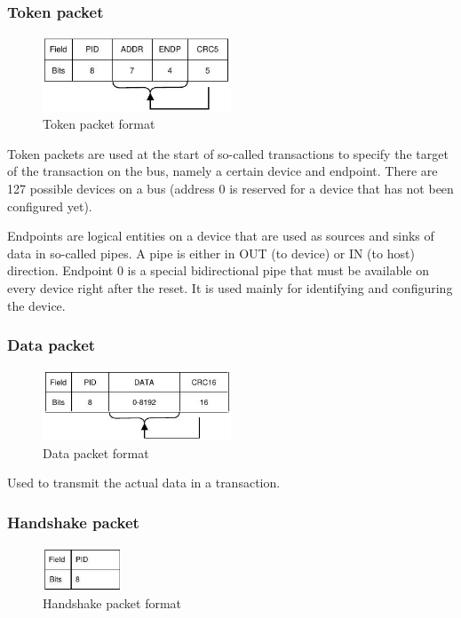 \documentclass{article}
\begin{document}
\subsubsection{Token packet}

\begin{figure}[H]
  \caption{Token packet format}
  \centering
  \includegraphics[width=0.5\textwidth]{images/token_packet.jpg}
\end{figure}

Token packets are used at the start of so-called transactions to specify the target
of the transaction on the bus, namely a certain device and endpoint. There are 127
possible devices on a bus (address 0 is reserved for a device that has not been configured yet).

Endpoints are logical entities on a device that are used as sources and sinks of data
in so-called pipes. A pipe is either in OUT (to device) or IN (to host) direction.
Endpoint 0 is a special bidirectional pipe that must be available on every device
right after the reset. It is used mainly for identifying and configuring the device.

\subsubsection{Data packet}

\begin{figure}[H]
  \caption{Data packet format}
  \centering
  \includegraphics[width=0.5\textwidth]{images/data_packet.jpg}
\end{figure}

Used to transmit the actual data in a transaction.

\subsubsection{Handshake packet}

\begin{figure}[H]
  \caption{Handshake packet format}
  \centering
  \includegraphics[width=0.21\textwidth]{images/handshake_packet.jpg}
\end{figure}
\end{document}
